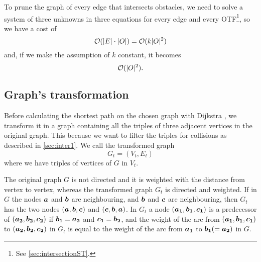 \documentclass[dissertation.tex]{subfiles}
\begin{document}
To prune the graph of every edge that intersects obstacles, we need
to solve a system of three unknowns in three equations for every edge
and every \ac{OTF}\footnote{See \cref{sec:intersectionST}.}, so
we have a cost of
\newcommand{\eqCostPruning}{\ensuremath{\bigO(k|\obsSet|^2)}}
\begin{equation}
  \label{eq:costPruning}
  \bigO(|E|\cdot|\obsSet|)=\eqCostPruning
\end{equation}
and, if we make the assumption of $k$ constant, it becomes
\begin{equation*}
  \mathcal{O}(|O|^2).
\end{equation*}

\subsection{Graph's transformation}\label{sec:trigraph}
Before calculating the shortest path on the chosen graph with Dijkstra
\cite{dijkstra}\cite{knuth}, we
transform it in a graph containing all the triples
of three adjacent vertices in the original graph. This because we want
to filter the triples for collisions as described in
\cref{sec:inter1}. We call the transformed graph
$$G_t=(V_t,E_t)$$
where we have triples of vertices of $G$ in $V_t$.

The original graph $G$ is not directed and it is weighted
with the distance from vertex to vertex, whereas the transformed graph $G_t$ is
directed and weighted. If in $G$ the nodes $\boldsymbol{a}$
and $\boldsymbol{b}$ are
neighbouring, and $\boldsymbol{b}$ and $\boldsymbol{c}$ are neighbouring, then $G_t$
has the two nodes $(\boldsymbol{a},\boldsymbol{b},\boldsymbol{c})$ and $(\boldsymbol{c},\boldsymbol{b},\boldsymbol{a})$. In
$G_t$ a node $(\boldsymbol{a_1},\boldsymbol{b_1},\boldsymbol{c_1})$ is a predecessor of
$(\boldsymbol{a_2},\boldsymbol{b_2},\boldsymbol{c_2})$ if $\boldsymbol{b_1}=\boldsymbol{a_2}$ and $\boldsymbol{c_1}=\boldsymbol{b_2}$, and the weight of the arc
from $(\boldsymbol{a_1},\boldsymbol{b_1},\boldsymbol{c_1})$ to $(\boldsymbol{a_2},\boldsymbol{b_2},\boldsymbol{c_2})$ in $G_t$ is
equal to
the weight of the arc from $\boldsymbol{a_1}$ to $\boldsymbol{b_1}(=\boldsymbol{a_2})$ in $G$.
\end{document}
